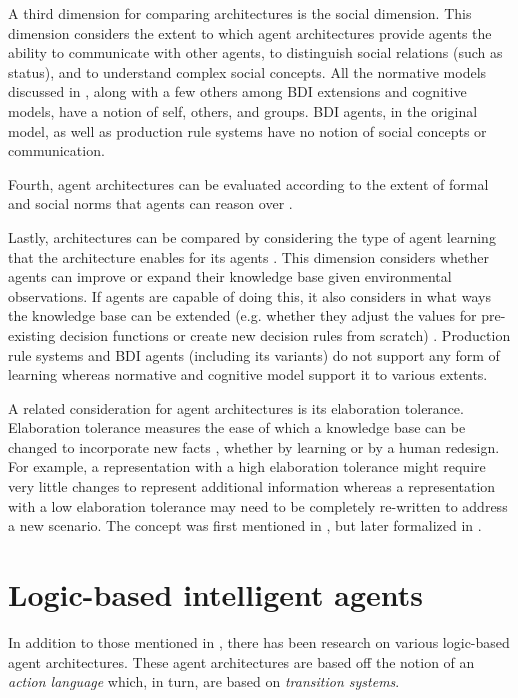 A third dimension for comparing architectures is the social dimension.
This dimension considers the extent to which agent architectures provide agents the ability to communicate with other agents, to distinguish social relations (such as status), and to understand complex social concepts.
All the normative models discussed in \cite{balke_how_2014}, along with a few others among BDI extensions and cognitive models, have a notion of self, others, and groups.
BDI agents, in the original model, as well as production rule systems have no notion of social concepts or communication.

Fourth, agent architectures can be evaluated according to the extent of formal and social norms that agents can reason over \cite{balke_how_2014}.

Lastly, architectures can be compared by considering the type of agent learning that the architecture enables for its agents \cite{balke_how_2014}.
This dimension considers whether agents can improve or expand their knowledge base given environmental observations.
If agents are capable of doing this, it also considers in what ways the knowledge base can be extended (e.g. whether they adjust the values for pre-existing decision functions or create new decision rules from scratch) \cite{balke_how_2014}.
Production rule systems and BDI agents (including its variants) do not support any form of learning whereas normative and cognitive model support it to various extents.

A related consideration for agent architectures is its elaboration tolerance.
Elaboration tolerance measures the ease of which a knowledge base can be changed to incorporate new facts \cite{parmar_formalizing_2003}, whether by learning or by a human redesign.
For example, a representation with a high elaboration tolerance might require very little changes to represent additional information whereas a representation with a low elaboration tolerance may need to be completely re-written to address a new scenario.
The concept was first mentioned in \cite{mccarthy_mathematical_1988}, but later formalized in \cite{parmar_formalizing_2003}.

\section{Logic-based intelligent agents}
\label{sec:logic_based_agents}

In addition to those mentioned in \cite{balke_how_2014}, there has been research on various logic-based agent architectures.
These agent architectures are based off the notion of an \textit{action language} which, in turn, are based on \textit{transition systems}.

